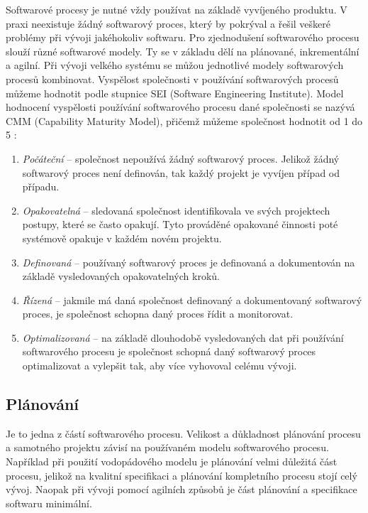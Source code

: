 \documentclass[czech,master,public,dept460,male,cpdeclaration,oneside]{diploma}
\begin{document}
Softwarové procesy je nutné vždy používat na základě vyvíjeného produktu. V praxi neexistuje žádný softwarový proces, který by pokrýval a řešil veškeré problémy při vývoji jakéhokoliv softwaru. Pro zjednodušení softwarového procesu slouží různé softwarové modely. Ty se v základu dělí na plánované, inkrementální a agilní. Při vývoji velkého systému se můžou jednotlivé modely softwarových procesů kombinovat. Vyspělost společnosti v používání softwarových procesů můžeme hodnotit podle stupnice SEI (Software
Engineering Institute). Model hodnocení vyspělosti používání softwarového procesu dané společnosti se nazývá CMM (Capability Maturity Model), přičemž můžeme společnost hodnotit od 1 do 5 \cite{ref:sw_process_vondrak}:

\begin{enumerate}
\item \textit{Počáteční} -- společnost nepoužívá žádný softwarový proces. Jelikož žádný softwarový proces není definován, tak každý projekt je vyvíjen případ od případu.
\item \textit{Opakovatelná} -- sledovaná společnost identifikovala ve svých projektech postupy, které se často opakují. Tyto prováděné opakované činnosti poté systémově opakuje v každém novém projektu.
\item \textit{Definovaná} -- používaný softwarový proces je definovaná a dokumentován na základě vysledovaných opakovatelných kroků.
\item \textit{Řízená} -- jakmile má daná společnost definovaný a dokumentovaný softwarový proces, je společnost schopna daný proces řídit a monitorovat. 
\item \textit{Optimalizovaná} -- na základě dlouhodobě vysledovaných dat při používání softwarového procesu je společnost schopná daný softwarový proces optimalizovat a vylepšit tak, aby více vyhovoval celému vývoji.
\end{enumerate}


\subsection{Plánování}
Je to jedna z částí softwarového procesu. Velikost a důkladnost plánování procesu a samotného projektu závisí na používaném modelu softwarového procesu. Například při použití vodopádového modelu je plánování velmi důležitá část procesu, jelikož na kvalitní specifikaci a plánování kompletního procesu stojí celý vývoj. Naopak při vývoji pomocí agilních způsobů je část plánování a specifikace softwaru minimální. 
\end{document}
